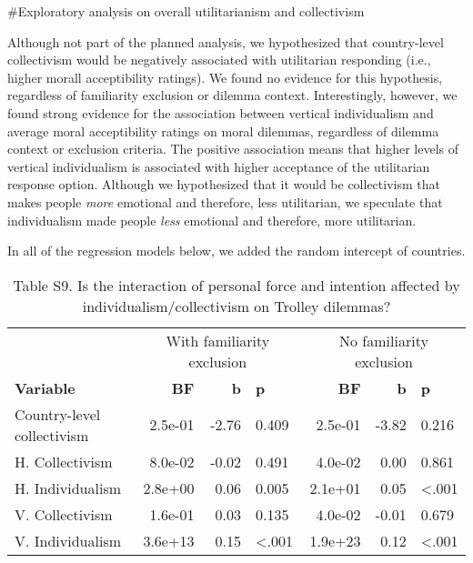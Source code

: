 \documentclass[
]{article}
\begin{document}
\#Exploratory analysis on overall utilitarianism and collectivism

Although not part of the planned analysis, we hypothesized that
country-level collectivism would be negatively associated with
utilitarian responding (i.e., higher morall acceptibility ratings). We
found no evidence for this hypothesis, regardless of familiarity
exclusion or dilemma context. Interestingly, however, we found strong
evidence for the association between vertical individualism and average
moral acceptibility ratings on moral dilemmas, regardless of dilemma
context or exclusion criteria. The positive association means that
higher levels of vertical individualism is associated with higher
acceptance of the utilitarian response option. Although we hypothesized
that it would be collectivism that makes people \emph{more} emotional
and therefore, less utilitarian, we speculate that individualism made
people \emph{less} emotional and therefore, more utilitarian.

In all of the regression models below, we added the random intercept of
countries.

\begin{table}[H]

\caption{\label{tab:analysis individual + country level study 2a}Table S9. Is the interaction of personal force and intention affected by individualism/collectivism on Trolley dilemmas?}
\begin{tabular}[t]{lrrlrrl}
\toprule
\multicolumn{1}{c}{ } & \multicolumn{3}{c}{With familiarity exclusion} & \multicolumn{3}{c}{No familiarity exclusion} \\
\cmidrule(l{3pt}r{3pt}){2-4} \cmidrule(l{3pt}r{3pt}){5-7}
\textbf{Variable} & \textbf{BF} & \textbf{b} & \textbf{p} & \textbf{BF} & \textbf{b} & \textbf{p}\\
\midrule
Country-level collectivism & 2.5e-01 & -2.76 & 0.409 & 2.5e-01 & -3.82 & 0.216\\
H. Collectivism & 8.0e-02 & -0.02 & 0.491 & 4.0e-02 & 0.00 & 0.861\\
H. Individualism & 2.8e+00 & 0.06 & 0.005 & 2.1e+01 & 0.05 & <.001\\
V. Collectivism & 1.6e-01 & 0.03 & 0.135 & 4.0e-02 & -0.01 & 0.679\\
V. Individualism & 3.6e+13 & 0.15 & <.001 & 1.9e+23 & 0.12 & <.001\\
\bottomrule
\end{tabular}
\end{table}
\end{document}
